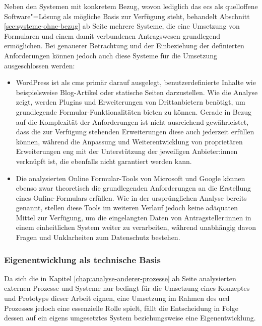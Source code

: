 \documentclass[a4paper,12pt,twoside]{scrreprt}
\begin{document}
Neben den Systemen mit konkretem Bezug, wovon lediglich das \ac{ecs} als quelloffene Software"=Lösung als mögliche Basis zur Verfügung steht, behandelt Abschnitt \ref{sec:systeme-ohne-bezug} ab Seite \pageref{sec:systeme-ohne-bezug} mehrere Systeme, die eine Umsetzung von Formularen und einem damit verbundenen Antragswesen grundlegend ermöglichen. Bei genauerer Betrachtung und der Einbeziehung der definierten Anforderungen können jedoch auch diese Systeme für die Umsetzung ausgeschlossen werden:
\begin{itemize}
    \item WordPress ist als \ac{cms} primär darauf ausgelegt, benutzerdefinierte Inhalte wie beispielsweise Blog-Artikel oder statische Seiten darzustellen. Wie die Analyse zeigt, werden Plugins und Erweiterungen von Drittanbietern benötigt, um grundlegende Formular-Funktionalitäten bieten zu können. Gerade in Bezug auf die Komplexität der Anforderungen ist nicht ausreichend gewährleistet, dass die zur Verfügung stehenden Erweiterungen diese auch jederzeit erfüllen können, während die Anpassung und Weiterentwicklung von proprietären Erweiterungen eng mit der Unterstützung der jeweiligen Anbieter:innen verknüpft ist, die ebenfalls nicht garantiert werden kann.
    \item Die analysierten Online Formular-Tools von Microsoft und Google können ebenso zwar theoretisch die grundlegenden Anforderungen an die Erstellung eines Online-Formulars erfüllen. Wie in der ursprünglichen Analyse bereits genannt, stellen diese Tools im weiteren Verlauf jedoch keine adäquaten Mittel zur Verfügung, um die eingelangten Daten von Antragsteller:innen in einem einheitlichen System weiter zu verarbeiten, während unabhängig davon Fragen und Unklarheiten zum Datenschutz bestehen.
\end{itemize}

\subsubsection*{Eigenentwicklung als technische Basis}
\label{sub-sub-sec:technische-basis-eigenentwicklung}

Da sich die in Kapitel \ref{chap:analyse-anderer-prozesse} ab Seite \pageref{chap:analyse-anderer-prozesse} analysierten externen Prozesse und Systeme nur bedingt für die Umsetzung eines Konzeptes und Prototyps dieser Arbeit eignen, eine Umsetzung im Rahmen des \acl{ucd} Prozesses jedoch eine essenzielle Rolle spielt, fällt die Entscheidung in Folge dessen auf ein eigens umgesetztes System beziehungsweise eine Eigenentwicklung.
\end{document}
